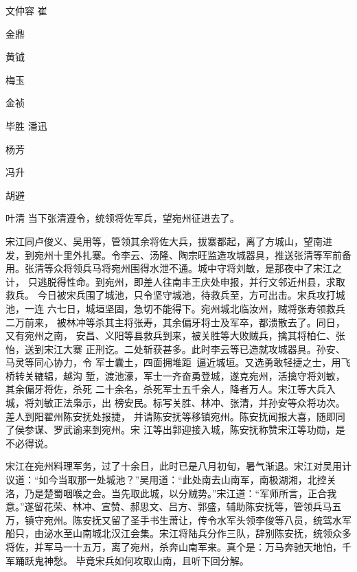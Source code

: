 文仲容
崔

金鼎

黄钺

梅玉

金祯

毕胜
潘迅

杨芳

冯升

胡避

叶清
当下张清遵令，统领将佐军兵，望宛州征进去了。

宋江同卢俊义、吴用等，管领其余将佐大兵，拔寨都起，离了方城山，望南进
发，到宛州十里外扎寨。令李云、汤隆、陶宗旺监造攻城器具，推送张清等军前备
用。张清等众将领兵马将宛州围得水泄不通。城中守将刘敏，是那夜中了宋江之计，
只逃脱得性命。到宛州，即差人往南丰王庆处申报，并行文邻近州县，求取救兵。
今日被宋兵围了城池，只令坚守城池，待救兵至，方可出击。宋兵攻打城池，一连
六七日，城垣坚固，急切不能得下。宛州城北临汝州，贼将张寿领救兵二万前来，
被林冲等杀其主将张寿，其余偏牙将士及军卒，都溃散去了。同日，又有宛州之南，
安昌、义阳等县救兵到来，被关胜等大败贼兵，擒其将柏仁、张怡，送到宋江大寨
正刑讫。二处斩获甚多。此时李云等已造就攻城器具。孙安、马灵等同心协力，令
军士囊土，四面拥堆距，逼近城垣。又选勇敢轻捷之士，用飞桥转关辘辒，越沟
堑，渡池濠，军士一齐奋勇登城，遂克宛州，活擒守将刘敏，其余偏牙将佐，杀死
二十余名，杀死军士五千余人，降者万人。宋江等大兵入城，将刘敏正法枭示，出
榜安民。标写关胜、林冲、张清，并孙安等众将功次。差人到阳翟州陈安抚处报捷，
并请陈安抚等移镇宛州。陈安抚闻报大喜，随即同了侯参谋、罗武谕来到宛州。宋
江等出郭迎接入城，陈安抚称赞宋江等功勋，是不必得说。

宋江在宛州料理军务，过了十余日，此时已是八月初旬，暑气渐退。宋江对吴用计
议道：“如今当取那一处城池？”吴用道：“此处南去山南军，南极湖湘，北控关
洛，乃是楚蜀咽喉之会。当先取此城，以分贼势。”宋江道：“军师所言，正合我
意。”遂留花荣、林冲、宣赞、郝思文、吕方、郭盛，辅助陈安抚等，管领兵马五
万，镇守宛州。陈安抚又留了圣手书生萧让，传令水军头领李俊等八员，统驾水军
船只，由泌水至山南城北汉江会集。宋江将陆兵分作三队，辞别陈安抚，统领众多
将佐，并军马一十五万，离了宛州，杀奔山南军来。真个是：万马奔驰天地怕，千
军踊跃鬼神愁。
毕竟宋兵如何攻取山南，且听下回分解。